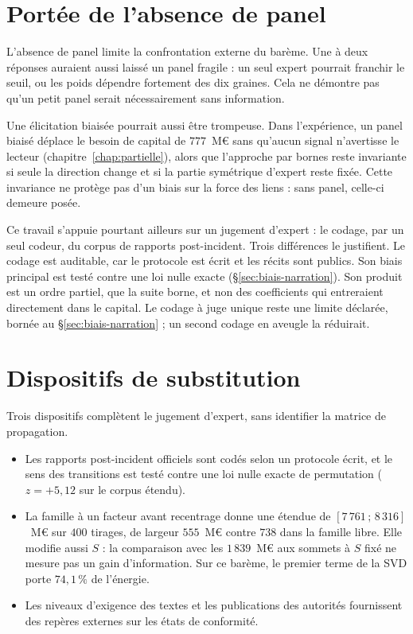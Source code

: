 \section{Portée de l'absence de panel}

L'absence de panel limite la confrontation externe du barème. Une à deux réponses auraient aussi
laissé un panel fragile : un seul expert pourrait franchir le seuil, ou les poids dépendre fortement
des dix graines. Cela ne démontre pas qu'un petit panel serait nécessairement sans information.

Une élicitation biaisée pourrait aussi être trompeuse. Dans l'expérience, un panel biaisé déplace le besoin de capital de $777$~M\euro{}
sans qu'aucun signal n'avertisse le lecteur (chapitre~\ref{chap:partielle}), alors que l'approche par
bornes reste invariante si seule la direction change et si la partie symétrique d'expert reste fixée. Cette invariance ne protège pas d'un biais sur la force des liens : sans panel, celle-ci demeure posée.

Ce travail s'appuie pourtant ailleurs sur un jugement d'expert : le codage, par un seul codeur, du
corpus de rapports post-incident. Trois différences le justifient. Le codage est auditable, car le
protocole est écrit et les récits sont publics. Son biais principal est testé contre une loi nulle
exacte (\S\ref{sec:biais-narration}). Son produit est un ordre partiel, que la suite borne, et non des
coefficients qui entreraient directement dans le capital. Le codage à juge unique reste une limite
déclarée, bornée au \S\ref{sec:biais-narration} ; un second codage en aveugle la réduirait.

\section{Dispositifs de substitution}

Trois dispositifs complètent le jugement d'expert, sans identifier la matrice de propagation.
\begin{itemize}[itemsep=3pt,topsep=3pt]
\item Les rapports post-incident officiels sont codés selon un protocole écrit, et le sens des
      transitions est testé contre une loi nulle exacte de permutation ($z = +5{,}12$ sur le corpus
      étendu).
\item La famille à un facteur avant recentrage donne une étendue de
      $[7\,761\,;\,8\,316]$~M\euro{} sur $400$ tirages, de largeur $555$~M\euro{} contre $738$
      dans la famille libre. Elle modifie aussi $S$ : la comparaison avec les $1\,839$~M\euro{}
      aux sommets à $S$ fixé ne mesure pas un gain d'information. Sur ce barème, le premier terme
      de la SVD porte $74{,}1\,\%$ de l'énergie.
\item Les niveaux d'exigence des textes et les publications des autorités fournissent des repères
      externes sur les états de conformité.
\end{itemize}


